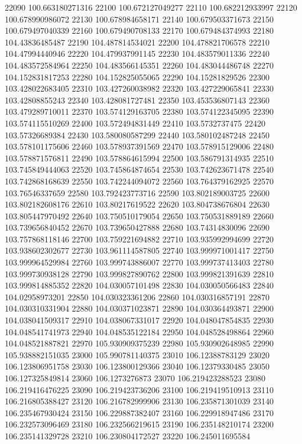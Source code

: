 {22090 100.663180271316
22100 100.672127049277
22110 100.682212933997
22120 100.678990986072
22130 100.678984658171
22140 100.679503371673
22150 100.679497040339
22160 100.679490708133
22170 100.679484374993
22180 104.43836485487
22190 104.487814534021
22200 104.478821706578
22210 104.47994440946
22220 104.479937991145
22230 104.483579011336
22240 104.483572584964
22250 104.483566145351
22260 104.483044486748
22270 104.152831817253
22280 104.152825055065
22290 104.15281829526
22300 103.428022683405
22310 103.427260038982
22320 103.427229065841
22330 103.42808855243
22340 103.428081727481
22350 103.453536807143
22360 103.479289710011
22370 103.574129163705
22380 103.574122345095
22390 103.574115510269
22400 103.572494831449
22410 103.5732737475
22420 103.57326689384
22430 103.580080587299
22440 103.580102487248
22450 103.578101175606
22460 103.578937391569
22470 103.578915129006
22480 103.578871576811
22490 103.578864615994
22500 103.586791314935
22510 103.745849444063
22520 103.745864874654
22530 103.742623671478
22540 103.742868168639
22550 103.742244094072
22560 103.764379162925
22570 103.76546337659
22580 103.792423773716
22590 103.802189003725
22600 103.802182608176
22610 103.80217619522
22620 103.804738676804
22630 103.805447970492
22640 103.750510179054
22650 103.750531889189
22660 103.739656840452
22670 103.739650427888
22680 103.74314830096
22690 103.757868118146
22700 103.759221694882
22710 103.935992994699
22720 103.938602302677
22730 103.961114587805
22740 103.999971001417
22750 103.999964529984
22760 103.999743886007
22770 103.999737413403
22780 103.999730938128
22790 103.999827890762
22800 103.999821391639
22810 103.999814885352
22820 104.030057101498
22830 104.030050566483
22840 104.02958973201
22850 104.030323361206
22860 104.030316857191
22870 104.030310331904
22880 104.030371023871
22890 104.030364493871
22900 104.038041509317
22910 104.038067331017
22920 104.048047854835
22930 104.048541741973
22940 104.048535122184
22950 104.048528498864
22960 104.048521887821
22970 105.930909375239
22980 105.930902648985
22990 105.938882151035
23000 105.990781140375
23010 106.12388783129
23020 106.123806951758
23030 106.123800129366
23040 106.12379330485
23050 106.127325849814
23060 106.1273276873
23070 106.219423288523
23080 106.219416476225
23090 106.219423736206
23100 106.219419510913
23110 106.216805388427
23120 106.216782999906
23130 106.235871301039
23140 106.235467930424
23150 106.229887382407
23160 106.229918947486
23170 106.232573096469
23180 106.232566219615
23190 106.235148210174
23200 106.235141329728
23210 106.230804172527
23220 106.245011695584
}
